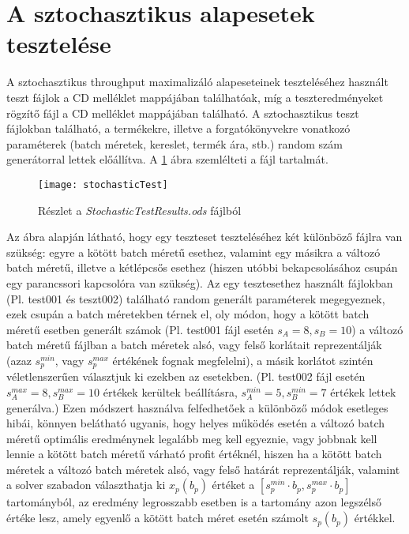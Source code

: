 \section{A sztochasztikus alapesetek tesztelése}
A sztochasztikus throughput maximalizáló alapeseteinek teszteléséhez használt teszt fájlok a CD melléklet   mappájában találhatóak, míg a teszteredményeket rögzítő  fájl a CD melléklet  mappájában található.
A sztochasztikus teszt fájlokban található, a termékekre, illetve a forgatókönyvekre vonatkozó paraméterek (batch méretek, kereslet, termék ára, stb.) random szám generátorral lettek előállítva.
A \ref{stochastic_test} ábra szemlélteti a  fájl tartalmát.
\begin{figure}[H]
\begin{center}
\texttt{[image: stochasticTest]}
\caption{Részlet a \textit{StochasticTestResults.ods} fájlból}
\label{stochastic_test}
\end{center}
\end{figure}
 Az ábra alapján látható, hogy egy teszteset teszteléséhez két különböző fájlra van szükség: egyre a kötött batch méretű esethez, valamint egy másikra a változó batch méretű, illetve a kétlépcsős esethez (hiszen utóbbi bekapcsolásához csupán egy parancssori kapcsolóra van szükség).
Az egy tesztesethez használt fájlokban (Pl. test001 és teszt002) található random generált paraméterek megegyeznek, ezek csupán a batch méretekben térnek el, oly módon, hogy a kötött batch méretű esetben generált számok (Pl. test001 fájl esetén $s_A=8, s_B=10$) a változó batch méretű fájlban a batch méretek alsó, vagy felső korlátait reprezentálják (azaz $s_p^{min}$, vagy $s_p^{max}$ értékének fognak megfelelni), a másik korlátot szintén véletlenszerűen választjuk ki ezekben az esetekben. (Pl. test002 fájl esetén $s_A^{max}=8, s_B^{max}=10$ értékek kerültek beállításra, $s_A^{min}=5, s_B^{min}=7$ értékek lettek generálva.)
Ezen módszert használva felfedhetőek a különböző módok esetleges hibái, könnyen belátható ugyanis, hogy helyes működés esetén a változó batch méretű optimális eredménynek legalább meg kell egyeznie, vagy jobbnak kell lennie a kötött batch méretű várható profit értéknél, hiszen ha a kötött batch méretek a változó batch méretek alsó, vagy felső határát reprezentálják, valamint a solver szabadon választhatja ki $x_p(b_p)$ értéket a $[s_p^{min}\cdot b_p,s_p^{max}\cdot b_p]$ tartományból, az eredmény legrosszabb esetben is a tartomány azon legszélső értéke lesz, amely egyenlő a kötött batch méret esetén számolt $s_p(b_p)$ értékkel.
